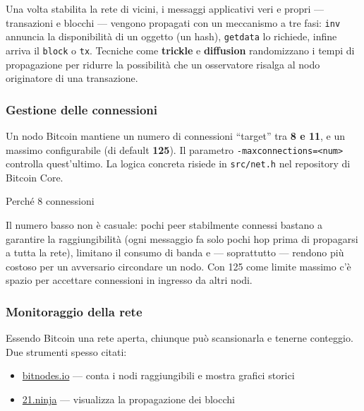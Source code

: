 \documentclass[
  italian,
  openany]{book}
\providecommand{\tightlist}{%
  \setlength{\itemsep}{0pt}\setlength{\parskip}{0pt}}
\begin{document}
Una volta stabilita la rete di vicini, i messaggi applicativi veri e
propri --- transazioni e blocchi --- vengono propagati con un meccanismo
a tre fasi: \texttt{inv} annuncia la disponibilità di un oggetto (un
hash), \texttt{getdata} lo richiede, infine arriva il \texttt{block} o
\texttt{tx}. Tecniche come \textbf{trickle} e \textbf{diffusion}
randomizzano i tempi di propagazione per ridurre la possibilità che un
osservatore risalga al nodo originatore di una transazione.

\subsubsection{Gestione delle
connessioni}\label{gestione-delle-connessioni}

Un nodo Bitcoin mantiene un numero di connessioni ``target'' tra
\textbf{8 e 11}, e un massimo configurabile (di default \textbf{125}).
Il parametro \texttt{-maxconnections=\textless{}num\textgreater{}}
controlla quest'ultimo. La logica concreta risiede in \texttt{src/net.h}
nel repository di Bitcoin Core.

\begin{callouttip}{Perché 8 connessioni}

Il numero basso non è casuale: pochi peer stabilmente connessi bastano a
garantire la raggiungibilità (ogni messaggio fa solo pochi hop prima di
propagarsi a tutta la rete), limitano il consumo di banda e ---
soprattutto --- rendono più costoso per un avversario circondare un
nodo. Con 125 come limite massimo c'è spazio per accettare connessioni
in ingresso da altri nodi.

\end{callouttip}

\subsubsection{Monitoraggio della rete}\label{monitoraggio-della-rete}

Essendo Bitcoin una rete aperta, chiunque può scansionarla e tenerne
conteggio. Due strumenti spesso citati:

\begin{itemize}
\tightlist
\item
  \href{https://bitnodes.io/}{bitnodes.io} --- conta i nodi
  raggiungibili e mostra grafici storici
\item
  \href{https://21.ninja/}{21.ninja} --- visualizza la propagazione dei
  blocchi
\end{itemize}
\end{document}
